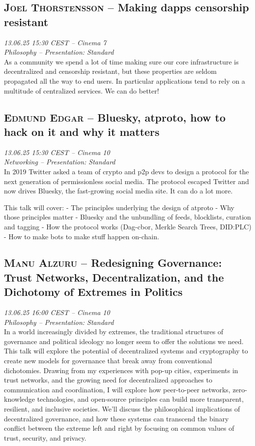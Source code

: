 \clearpage
\subsection {\textsc{Joel Thorstensson}  -- Making dapps censorship resistant} \noindent \textit {13.06.25 15:30 CEST -- Cinema 7\\ Philosophy -- Presentation: Standard}\\[1em] As a community we spend a lot of time making sure our core infrastructure is decentralized and censorship resistant, but these properties are seldom propagated all the way to end users. In particular applications tend to rely on a multitude of centralized services. We can do better!

\clearpage
\subsection {\textsc{Edmund Edgar}  -- Bluesky, atproto, how to hack on it and why it matters} \noindent \textit {13.06.25 15:30 CEST -- Cinema 10\\ Networking -- Presentation: Standard}\\[1em] In 2019 Twitter asked a team of crypto and p2p devs to design a protocol for the next generation of permissionless social media. The protocol escaped Twitter and now drives Bluesky, the fast-growing social media site. It can do a lot more.

This talk will cover:
 - The principles underlying the design of atproto
 - Why those principles matter
 - Bluesky and the unbundling of feeds, blocklists, curation and tagging
 - How the protocol works (Dag-cbor, Merkle Search Trees, DID:PLC)
 - How to make bots to make stuff happen on-chain.

\clearpage
\subsection {\textsc{Manu Alzuru}  -- Redesigning Governance: Trust Networks, Decentralization, and the Dichotomy of Extremes in Politics} \noindent \textit {13.06.25 16:00 CEST -- Cinema 10\\ Philosophy -- Presentation: Standard}\\[1em] In a world increasingly divided by extremes, the traditional structures of governance and political ideology no longer seem to offer the solutions we need. This talk will explore the potential of decentralized systems and cryptography to create new models for governance that break away from conventional dichotomies. Drawing from my experiences with pop-up cities, experiments in trust networks, and the growing need for decentralized approaches to communication and coordination, I will explore how peer-to-peer networks, zero-knowledge technologies, and open-source principles can build more transparent, resilient, and inclusive societies. We’ll discuss the philosophical implications of decentralized governance, and how these systems can transcend the binary conflict between the extreme left and right by focusing on common values of trust, security, and privacy.

